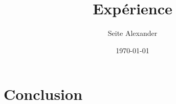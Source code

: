 \documentclass[letterpaper,12pt]{article}
\begin{document}
\title{Expérience}
\author{Seite Alexander}
\date{\today}
\maketitle
\newline

\tableofcontents

\newpage






























\section{Conclusion}





\end{document}
